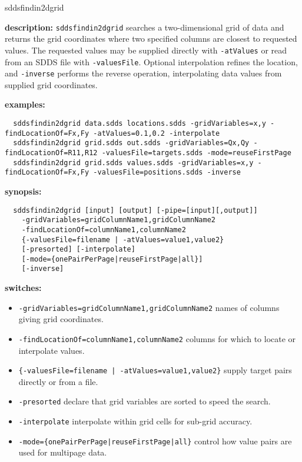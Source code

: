 \begin{sddsprog}{sddsfindin2dgrid}
  \item \textbf{description:} \verb|sddsfindin2dgrid| searches a two-dimensional grid of data and returns the grid coordinates where two specified columns are closest to requested values. The requested values may be supplied directly with \verb|-atValues| or read from an SDDS file with \verb|-valuesFile|. Optional interpolation refines the location, and \verb|-inverse| performs the reverse operation, interpolating data values from supplied grid coordinates.
  \item \textbf{examples:}
  \begin{verbatim}
  sddsfindin2dgrid data.sdds locations.sdds -gridVariables=x,y -findLocationOf=Fx,Fy -atValues=0.1,0.2 -interpolate
  sddsfindin2dgrid grid.sdds out.sdds -gridVariables=Qx,Qy -findLocationOf=R11,R12 -valuesFile=targets.sdds -mode=reuseFirstPage
  sddsfindin2dgrid grid.sdds values.sdds -gridVariables=x,y -findLocationOf=Fx,Fy -valuesFile=positions.sdds -inverse
  \end{verbatim}
  \item \textbf{synopsis:}
  \begin{verbatim}
  sddsfindin2dgrid [input] [output] [-pipe=[input][,output]]
    -gridVariables=gridColumnName1,gridColumnName2
    -findLocationOf=columnName1,columnName2
    {-valuesFile=filename | -atValues=value1,value2}
    [-presorted] [-interpolate]
    [-mode={onePairPerPage|reuseFirstPage|all}]
    [-inverse]
  \end{verbatim}
  \item \textbf{switches:}
  \begin{itemize}
    \item \verb|-gridVariables=gridColumnName1,gridColumnName2| \textendash{} names of columns giving grid coordinates.
    \item \verb|-findLocationOf=columnName1,columnName2| \textendash{} columns for which to locate or interpolate values.
    \item \verb+{-valuesFile=filename | -atValues=value1,value2}+ \textendash{} supply target pairs directly or from a file.
    \item \verb|-presorted| \textendash{} declare that grid variables are sorted to speed the search.
    \item \verb|-interpolate| \textendash{} interpolate within grid cells for sub-grid accuracy.
    \item \verb+-mode={onePairPerPage|reuseFirstPage|all}+ \textendash{} control how value pairs are used for multipage data.

\end{itemize}
\end{sddsprog}
